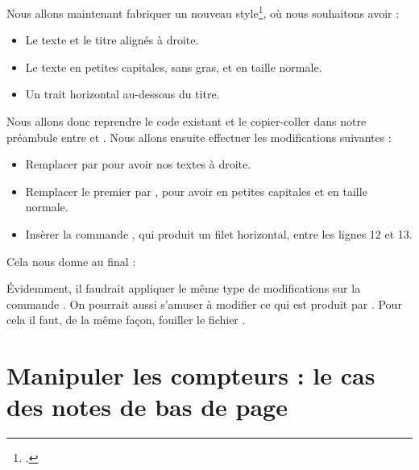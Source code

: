 Nous allons maintenant fabriquer un nouveau style\footcite[Nous nous inspirons ici du style de la classe ][]{bredele}, où
nous souhaitons avoir :
\begin{itemize}
\item Le texte  et le titre alignés à droite.
\item Le texte  en  petites capitales, sans gras, et en taille normale.
\item Un trait horizontal au-dessous du titre.
\end{itemize}

Nous allons donc reprendre le code existant et le copier-coller dans notre préambule entre  et . Nous allons ensuite effectuer les modifications suivantes :

\begin{itemize}
\item Remplacer  par  pour avoir nos textes à droite.
\item Remplacer le premier  par , pour avoir  en petites capitales et en taille normale.
\item Insèrer la commande , qui produit un filet horizontal, entre les lignes 12 et 13.
\end{itemize}

Cela nous donne au final :

\begin{latexcode}
\makeatletter
\def\@makechapterhead#1{%
  \vspace*{50\p@}%
  {\parindent \z@ \raggedleft \normalfont
    \ifnum \c@secnumdepth >\m@ne
      \if@mainmatter
       \scshape \@chapapp\space \thechapter
        \par\nobreak
        \vskip 20\p@
      \fi
    \fi
    \interlinepenalty\@M
    \Huge \bfseries #1\par\nobreak
    \hrulefill
    \vskip 40\p@
  }}
\makeatother
\end{latexcode}

Évidemment, il faudrait appliquer le même type de modifications sur la commande . On pourrait aussi s'amuser à modifier ce qui est produit par . Pour cela  il faut, de la même façon, fouiller le fichier .

\section[Manipuler les compteurs]{Manipuler les compteurs : le cas des notes de bas de page}\label{manipcompteurs}

